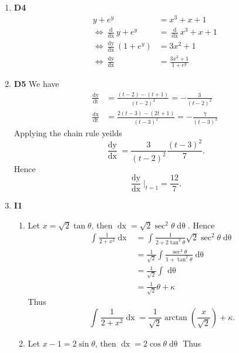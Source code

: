 \documentclass[12pt,oneside]{book}
\begin{document}
\begin{enumerate}
        \item \textbf{D4} \begin{align*}
            y + e^y &= x^3 + x + 1 \\
            \iff \frac{\mathop{\mathrm{d}}}{\mathop{\mathrm{d}x}} y + e^y &= \frac{\mathop{\mathrm{d}}}{\mathop{\mathrm{d}x}} x^3 + x + 1 \\
            \iff \frac{\mathop{\mathrm{d}y}}{\mathop{\mathrm{d}x}} (1 + e^y) &= 3x^2 + 1 \\
            \iff \frac{\mathop{\mathrm{d}y}}{\mathop{\mathrm{d}x}} &= \frac{3x^2+1}{1+e^y}
        \end{align*}
        \item \textbf{D5} We have \begin{align*}
            \frac{\mathop{\mathrm{d}y}}{\mathop{\mathrm{d}t}} &= \frac{(t-2) - (t+1)}{(t-2)^2} = -\frac{3}{(t-2)^2}\\
            \frac{\mathop{\mathrm{d}x}}{\mathop{\mathrm{d}t}} &= \frac{2(t-3) - (2t+1)}{(t-3)^2} = - \frac{7}{(t-3)^2}
        \end{align*} Applying the chain rule yeilds \[
            \frac{\mathop{\mathrm{d}y}}{\mathop{\mathrm{d}x}} = \frac{3}{(t-2)^2} \frac{(t-3)^2}{7}
        .\] Hence \[
            \frac{\mathop{\mathrm{d}y}}{\mathop{\mathrm{d}x}} \Big|_{t = 1} = \frac{12}{7}
        .\] 
        \item \textbf{I1} \begin{enumerate}
            \item Let $x = \sqrt{2} \tan \theta$, then $\mathop{\mathrm{d}x} = \sqrt{2} \sec^2 \theta \mathop{\mathrm{d}\theta}$. Hence \begin{align*}
                \int_{}^{} \frac{1}{2+x^2} \mathop{\mathrm{d}x} &= \int_{}^{} \frac{1}{2 + 2 \tan^2 \theta}   \sqrt{2} \sec^2 \theta \mathop{\mathrm{d}\theta} \\
                &= \frac{1}{\sqrt{2}} \int_{}^{} \frac{\sec^2 \theta}{1 + \tan^2 \theta} \mathop{\mathrm{d}\theta}  \\
                &=  \frac{1}{\sqrt{2}} \int_{}^{} \mathop{\mathrm{d}\theta} \\
                &= \frac{1}{\sqrt{2}} \theta + \kappa 
            \end{align*}
            Thus \[
                \int_{}^{} \frac{1}{2+x^2} \mathop{\mathrm{d}x} = \frac{1}{\sqrt{2}} \arctan \left( \frac{x}{\sqrt{2}} \right)  + \kappa
            .\] 
            \item Let $x - 1 = 2 \sin \theta$, then $\mathop{\mathrm{d}x} = 2 \cos \theta \mathop{\mathrm{d}\theta} $ Thus \begin{align*}

\end{align*}
\end{enumerate}
\end{enumerate}
\end{document}

